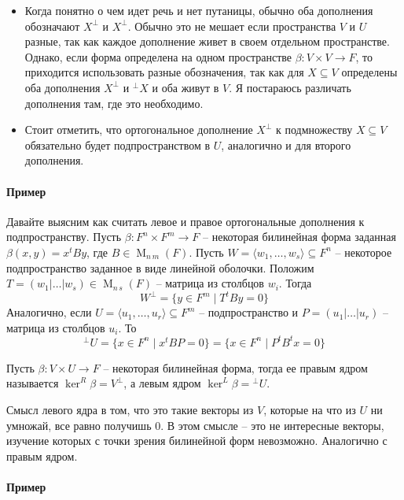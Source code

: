 \begin{itemize}
\item
Когда понятно о чем идет речь и нет путаницы, обычно оба дополнения обозначают $X^\bot$ и $X^\bot$.
Обычно это не мешает если пространства $V$ и $U$ разные, так как каждое дополнение живет в своем отдельном пространстве.
Однако, если форма определена на одном пространстве $\beta\colon V\times V\to F$, то приходится использовать разные обозначения, так как для $X\subseteq V$ определены оба дополнения $X^\bot$ и ${}^\bot X$ и оба живут в $V$.
Я постараюсь различать дополнения там, где это необходимо.

\item 
Стоит отметить, что ортогональное дополнение $X^\bot$ к подмножеству $X\subseteq V$ обязательно будет подпространством в $U$, аналогично и для второго дополнения.
\end{itemize}

\paragraph{Пример}

Давайте выясним как считать левое и правое ортогональные дополнения к подпространству.
Пусть $\beta\colon F^n\times F^m \to F$ -- некоторая билинейная форма заданная $\beta(x,y) = x^t B y$, где $B\in \operatorname{M}_{n\,m}(F)$.
Пусть $W = \langle w_1,\ldots,w_s\rangle\subseteq F^n$ -- некоторое подпространство заданное в виде линейной оболочки.
Положим $T = (w_1|\ldots|w_s)\in\operatorname{M}_{n\,s}(F)$ -- матрица из столбцов $w_i$.
Тогда 
\[
W^\bot = \{y\in F^m \mid T^t By = 0\}
\]
Аналогично, если $U=\langle u_1,\ldots,u_r \rangle \subseteq F^m$ -- подпространство и $P = (u_1|\ldots|u_r)$ -- матрица из столбцов $u_i$.
То
\[
{}^\bot U = \{x\in F^n\mid x^t B P = 0\} = 
\{x\in F^n \mid P^t B^t x = 0\}
\]

\begin{definition}
Пусть $\beta\colon V\times U\to F$ -- некоторая билинейная форма, тогда ее правым ядром называется $\ker^R \beta =V^\bot$, а левым ядром $\ker^L\beta = {}^\bot U$.
\end{definition}

Смысл левого ядра в том, что это такие векторы из $V$, которые на что из $U$ ни умножай, все равно получишь $0$.
В этом смысле -- это не интересные векторы, изучение которых с точки зрения билинейной форм невозможно.
Аналогично с правым ядром.

\paragraph{Пример}

